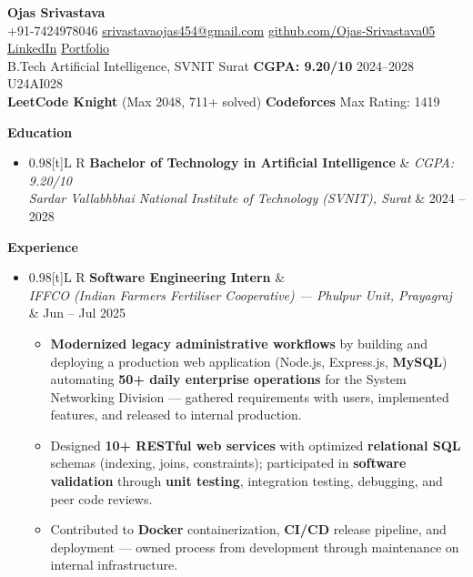 \documentclass[a4paper,10pt]{article}
\newcommand{\resumeSubheading}[4]{
  \vspace{0.5mm}\item
  \begin{tabularx}{0.98\textwidth}[t]{L R}
    \textbf{#1} & \textit{\footnotesize #4} \\
    \textit{\footnotesize #3} & \footnotesize #2 \\
  \end{tabularx}
  \vspace{-2.4mm}
}
\newcommand{\resumeSubHeadingListStart}{\begin{itemize}[leftmargin=*,labelsep=0mm]}
\newcommand{\resumeSubHeadingListEnd}{\end{itemize}\vspace{0.5mm}}
\newcommand{\resumeItemListStart}{\begin{justify}\begin{itemize}[leftmargin=3ex, rightmargin=2ex, noitemsep,labelsep=1.2mm,itemsep=0mm]\small}
\newcommand{\resumeItemListEnd}{\end{itemize}\end{justify}\vspace{-2mm}}
\newcommand{\cvsection}[1]{%
  \vspace{0.8mm}
  \begin{tcolorbox}
    \textbf{\large #1}
  \end{tcolorbox}
  \vspace{-4mm}
}
\begin{document}
\selectfont

\begin{center}
  {\LARGE \textbf{Ojas Srivastava}} \\[1mm]
  \small
  +91-7424978046 \textbar{}
  \href{mailto:srivastavaojas454@gmail.com}{srivastavaojas454@gmail.com} \textbar{}
  \href{https://github.com/Ojas-Srivastava05}{github.com/Ojas-Srivastava05} \textbar{}
  \href{https://linkedin.com/in/ojas-srivastava05}{LinkedIn} \textbar{}
  \href{https://ojas-srivastava.vercel.app}{Portfolio} \\[0.5mm]
  \small
  B.Tech Artificial Intelligence, SVNIT Surat \textbar{}
  \textbf{CGPA: 9.20/10} \textbar{}
  2024--2028 \textbar{}
  U24AI028 \\[0.5mm]
  \small
  \textbf{LeetCode Knight} (Max 2048, 711+ solved) \textbar{}
  \textbf{Codeforces} Max Rating: 1419
\end{center}

\vspace{-2.5mm}

\cvsection{Education}
\resumeSubHeadingListStart
  \resumeSubheading
    {Bachelor of Technology in Artificial Intelligence}{2024 -- 2028}
    {Sardar Vallabhbhai National Institute of Technology (SVNIT), Surat}{CGPA: 9.20/10}
\resumeSubHeadingListEnd

\cvsection{Experience}
\resumeSubHeadingListStart
  \resumeSubheading
    {Software Engineering Intern}{Jun -- Jul 2025}
    {IFFCO (Indian Farmers Fertiliser Cooperative) --- Phulpur Unit, Prayagraj}{}
    \resumeItemListStart
      \item \textbf{Modernized legacy administrative workflows} by building and deploying a production web application (Node.js, Express.js, \textbf{MySQL}) automating \textbf{50+ daily enterprise operations} for the System Networking Division --- gathered requirements with users, implemented features, and released to internal production.
      \item Designed \textbf{10+ RESTful web services} with optimized \textbf{relational SQL} schemas (indexing, joins, constraints); participated in \textbf{software validation} through \textbf{unit testing}, integration testing, debugging, and peer code reviews.
      \item Contributed to \textbf{Docker} containerization, \textbf{CI/CD} release pipeline, and deployment --- owned process from development through maintenance on internal infrastructure.
    \resumeItemListEnd
\resumeSubHeadingListEnd
\end{document}
